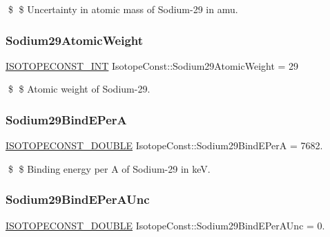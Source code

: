 \$ \$ Uncertainty in atomic mass of Sodium-\/29 in amu. \mbox{\label{group___isotope_const-_sodium-_na29_ga7d2aa85c103c25b506f59e554098f8c0}} 
\subsubsection{\texorpdfstring{Sodium29\+Atomic\+Weight}{Sodium29AtomicWeight}}
{\footnotesize\ttfamily \mbox{\hyperlink{group___isotope_const-_macros_ga5f18360b3e99483a35c32d789e62621c}{I\+S\+O\+T\+O\+P\+E\+C\+O\+N\+S\+T\+\_\+\+I\+NT}} Isotope\+Const\+::\+Sodium29\+Atomic\+Weight = 29}

\$ \$ Atomic weight of Sodium-\/29. \mbox{\label{group___isotope_const-_sodium-_na29_ga6f9b857cc01bd71fef7cf995a5298e3f}} 
\subsubsection{\texorpdfstring{Sodium29\+Bind\+E\+PerA}{Sodium29BindEPerA}}
{\footnotesize\ttfamily \mbox{\hyperlink{group___isotope_const-_macros_ga8f45a7272ce02c0b4c65c44636ed719a}{I\+S\+O\+T\+O\+P\+E\+C\+O\+N\+S\+T\+\_\+\+D\+O\+U\+B\+LE}} Isotope\+Const\+::\+Sodium29\+Bind\+E\+PerA = 7682.}

\$ \$ Binding energy per A of Sodium-\/29 in keV. \mbox{\label{group___isotope_const-_sodium-_na29_ga21b2d8a307428f24b3e8aaed19d578b6}} 
\subsubsection{\texorpdfstring{Sodium29\+Bind\+E\+Per\+A\+Unc}{Sodium29BindEPerAUnc}}
{\footnotesize\ttfamily \mbox{\hyperlink{group___isotope_const-_macros_ga8f45a7272ce02c0b4c65c44636ed719a}{I\+S\+O\+T\+O\+P\+E\+C\+O\+N\+S\+T\+\_\+\+D\+O\+U\+B\+LE}} Isotope\+Const\+::\+Sodium29\+Bind\+E\+Per\+A\+Unc = 0.}

